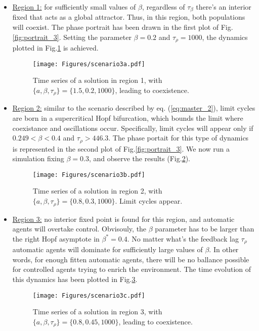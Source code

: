 \documentclass[10pt,a4paper]{article}
\begin{document}
\begin{itemize}
 \item {\underline{Region 1:} for sufficiently small values of $\beta$, regardless of $\tau_{\beta}$ there's an interior fixed that acts as a global attractor. Thus, in this 
 region, both populations will coexist. The phase portrait has been drawn in the first plot of Fig.\ref{fig:portrait_3}. Setting the parameter $\beta=0.2$ and $\tau_{\rho}=1000$, 
 the dynamics plotted in Fig.\ref{fig:scenario3a} is achieved.

\begin{figure}[h!]
\centering
\vspace{-2.0cm}
\texttt{[image: Figures/scenario3a.pdf]}
\vspace{-0.4cm}
\caption{Time series of a solution in region 1, with  $\{a,\beta,\tau_{\rho}\}=\{1.5,0.2,1000\}$, leading to coexistence.}
\label{fig:scenario3a}
\end{figure}
}

 \item {\underline{Region 2:} similar to the scenario described by eq. (\ref{eq:master_2}), limit cycles are born in  a supercritical Hopf bifurcation, which bounds the limit 
 where coexistance and oscillations occur. Specifically, limit cycles will appear only if $0.249<\beta<0.4$ and $\tau_{\rho}>446.3$. 
 The phase portait for this type of dynamics is represented in the second plot of Fig.\ref{fig:portrait_3}. We now run a simulation fixing $\beta=0.3$, and observe the results
 (Fig.\ref{fig:scenario3b}).
 
\begin{figure}[h!]
\centering
\vspace{-2.0cm}
\texttt{[image: Figures/scenario3b.pdf]}
\vspace{-0.4cm}
\caption{Time series of a solution in region 2, with  $\{a,\beta,\tau_{\rho}\}=\{0.8,0.3,1000\}$. Limit cycles appear.}
\label{fig:scenario3b}
\end{figure}
}

 \item {\underline{Region 3:} no interior fixed point is found for this region, and automatic agents will overtake control. Obvisouly, the $\beta$ parameter has to be larger
 than the right Hopf asymptote in $\beta^*=0.4$. No matter what's the feedback lag $\tau_{\rho}$ automatic agents will dominate for sufficiently large values of $\beta$. In other
 words, for enough fitten automatic agents, there will be no ballance possible for controlled agents trying to enrich the environment. The time evolution of this dynamics has been
 plotted in Fig.\ref{fig:scenario3c}.
 
\begin{figure}[h!]
\centering
\vspace{-2.0cm}
\texttt{[image: Figures/scenario3c.pdf]}
\vspace{-0.4cm}
\caption{Time series of a solution in region 3, with  $\{a,\beta,\tau_{\rho}\}=\{0.8,0.45,1000\}$, leading to coexistence.}
\label{fig:scenario3c}
\end{figure}
}

\end{itemize}
\end{document}
